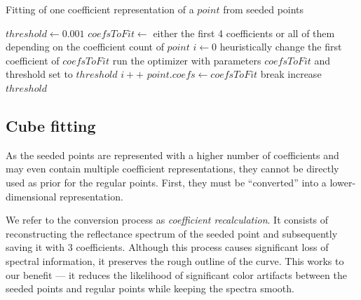\begin{algorithm}[t!]
	\caption{Fitting of one coefficient representation of a $point$ from seeded points}
	\label{alg:fittingAtlasLatticePoints}
	\begin{algorithmic}[1]
		\State $threshold \gets 0.001$
		\State $coefsToFit \gets$ either the first 4 coefficients or all of them depending on the coefficient count of $point$
		\State $i \gets 0$
		\State heuristically change the first coefficient of $coefsToFit$
		\State run the optimizer with parameters $coefsToFit$ and threshold set to $threshold$
		\State $i++$
		\EndWhile
		\State $point.coefs \gets coefsToFit$
		\State break
		\EndIf
		\State increase $threshold$
		\EndWhile
	\end{algorithmic}
\end{algorithm}

\subsection{Cube fitting} \label{ssec:cubeFitting}

As the seeded points are represented with a higher number of coefficients and may even contain multiple coefficient representations, they cannot be directly used as prior for the regular points. First, they must be ``converted'' into a lower-dimensional representation.

We refer to the conversion process as \emph{coefficient recalculation}. It consists of reconstructing the reflectance spectrum of the seeded point and subsequently saving it with 3 coefficients. Although this process causes significant loss of spectral information, it preserves the rough outline of the curve. This works to our benefit --- it reduces the likelihood of significant color artifacts between the seeded points and regular points while keeping the spectra smooth.

